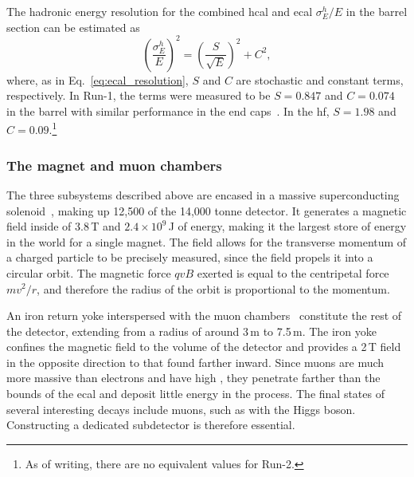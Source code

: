 The hadronic energy resolution for the combined \acrshort{hcal} and \acrshort{ecal} $\sigma_E^h/E$ in the barrel section can be estimated as
\begin{equation}
    \left( \frac{\sigma_E^h}{E} \right)^2 = \left( \frac{S}{\sqrt{E}} \right)^2 + C^2,
    \label{eq:hcal_resolution}
\end{equation}
where, as in Eq.~\ref{eq:ecal_resolution}, $S$ and $C$ are stochastic and constant terms, respectively. In Run-1, the terms were measured to be $S = \text{0.847}$ and $C = \text{0.074}$ in the barrel with similar performance in the end caps~\cite{cms_hcal_per_2010}. In the \acrshort{hf}, $S = \text{1.98}$ and $C = \text{0.09}$.\footnote{As of writing, there are no equivalent values for Run-2.}




\subsubsection{The magnet and muon chambers}
\label{subsubsec:cms_magnet_muons}

The three subsystems described above are encased in a massive superconducting solenoid~\cite{CERN-LHCC-97-010}, making up 12,500 of the 14,000 tonne detector. It generates a magnetic field inside of 3.8\,T and $\text{2.4} \times \text{10}^9$\,J of energy, making it the largest store of energy in the world for a single magnet. The field allows for the transverse momentum of a charged particle to be precisely measured, since the field propels it into a circular orbit. The magnetic force $qvB$ exerted is equal to the centripetal force $mv^2/r$, and therefore the radius of the orbit is proportional to the momentum.

An iron return yoke interspersed with the muon chambers~\cite{Layter:343814} constitute the rest of the detector, extending from a radius of around 3\,m to 7.5\,m. The iron yoke confines the magnetic field to the volume of the detector and provides a 2\,T field in the opposite direction to that found farther inward. Since muons are much more massive than electrons and have high \pt, they penetrate farther than the bounds of the \acrshort{ecal} and deposit little energy in the process. The final states of several interesting decays include muons, such as with the Higgs boson. Constructing a dedicated subdetector is therefore essential.

